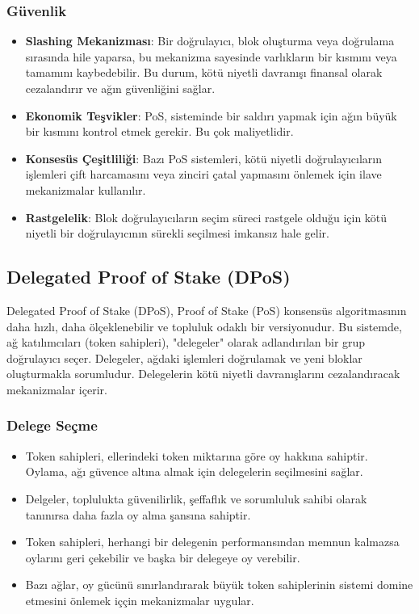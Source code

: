 \subsubsection{Güvenlik}

\begin{itemize}
    \item \textbf{Slashing Mekanizması}: Bir doğrulayıcı, blok oluşturma veya doğrulama sırasında hile yaparsa, bu mekanizma sayesinde varlıkların bir kısmını veya tamamını kaybedebilir. Bu durum, kötü niyetli davranışı finansal olarak cezalandırır ve ağın güvenliğini sağlar.
    \item \textbf{Ekonomik Teşvikler}: PoS, sisteminde bir saldırı yapmak için ağın büyük bir kısmını kontrol etmek gerekir. Bu çok maliyetlidir.
    \item \textbf{Konsesüs Çeşitliliği}: Bazı PoS sistemleri, kötü niyetli doğrulayıcıların işlemleri çift harcamasını veya zinciri çatal yapmasını önlemek için ilave mekanizmalar kullanılır. 
    \item \textbf{Rastgelelik}: Blok doğrulayıcıların seçim süreci rastgele olduğu için kötü niyetli bir doğrulayıcının sürekli seçilmesi imkansız hale gelir. 
\end{itemize}

\newpage

\subsection{Delegated Proof of Stake (DPoS)}

Delegated Proof of Stake (DPoS), Proof of Stake (PoS) konsensüs algoritmasının daha hızlı, daha ölçeklenebilir ve topluluk odaklı bir versiyonudur. Bu sistemde, ağ katılımcıları (token sahipleri), "delegeler" olarak adlandırılan bir grup doğrulayıcı seçer. Delegeler, ağdaki işlemleri doğrulamak ve yeni bloklar oluşturmakla sorumludur. Delegelerin kötü niyetli davranışlarını cezalandıracak mekanizmalar içerir.

\subsubsection{Delege Seçme}

\begin{itemize}
    \item Token sahipleri, ellerindeki token miktarına göre oy hakkına sahiptir. Oylama, ağı güvence altına almak için delegelerin seçilmesini sağlar.
    \item Delgeler, toplulukta güvenilirlik, şeffaflık ve sorumluluk sahibi olarak tanınırsa daha fazla oy alma şansına sahiptir.
    \item Token sahipleri, herhangi bir delegenin performansından memnun kalmazsa oylarını geri çekebilir ve başka bir delegeye oy verebilir.
    \item Bazı ağlar, oy gücünü sınırlandırarak büyük token sahiplerinin sistemi domine etmesini önlemek iççin mekanizmalar uygular.
\end{itemize}

